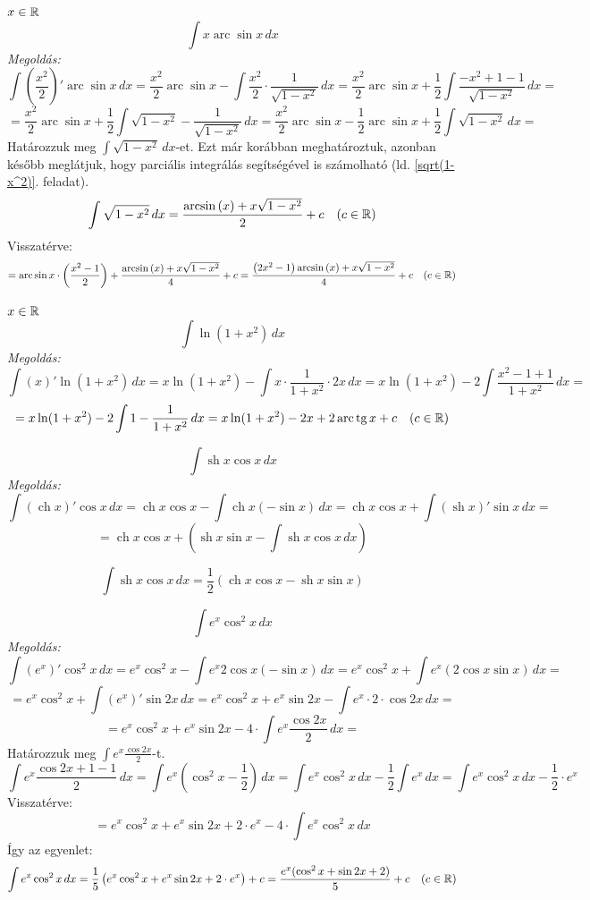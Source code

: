 \documentclass[a4paper,11.5pt]{article}
\DeclareMathOperator{\tg}{tg}
\DeclareMathOperator{\sh}{sh}
\DeclareMathOperator{\ch}{ch}
\DeclareMathOperator{\arc}{arc}
\begin{document}
	\begin{exercise}
		$x\in\mathbb{R}$
		\[ \int x\arc\sin x\,dx \]
		\textit{Megoldás:}
		\[ \int\left(\frac{x^2}{2}\right)'\arc\sin x\,dx=\frac{x^2}{2}\arc\sin x-\int\frac{x^2}{2}\cdot\frac{1}{\sqrt{1-x^2}}\,dx=\frac{x^2}{2}\arc\sin x + \frac{1}{2}\int\frac{-x^2+1-1}{\sqrt{1-x^2}}\,dx= \]
		\[ =\frac{x^2}{2}\arc\sin x+ \frac{1}{2}\int\sqrt{1-x^2}-\frac{1}{\sqrt{1-x^2}}\,dx=\frac{x^2}{2}\arc\sin x-\frac{1}{2}\arc\sin x+\frac{1}{2}\int\sqrt{1-x^2}\,dx=\]
		Határozzuk meg $\int\sqrt{1-x^2}\,dx$-et. Ezt már korábban meghatároztuk, azonban később meglátjuk, hogy parciális integrálás segítségével is számolható (ld. \ref{sqrt(1-x^2)}. feladat).
		\[ \int\sqrt{1-x^2}\,dx=\frac{\arcsin\left(x\right)+x\sqrt{1-x^2}}{2}+c\quad (c\in\mathbb{R}) \]
		Visszatérve:
		\[ =\arc\sin x\cdot\left(\frac{x^2-1}{2}\right)+\frac{\arcsin\left(x\right)+x\sqrt{1-x^2}}{4}+c=\frac{\left(2x^2-1\right)\arcsin\left(x\right)+x\sqrt{1-x^2}}{4}+c\quad (c\in\R) \]
	\end{exercise}
	\begin{exercise}
		$x\in\mathbb{R}$
		\[ \int\ln(1+x^2)\,dx\]
		\textit{Megoldás:}
		\[\int(x)'\ln(1+x^2)\,dx=x\ln(1+x^2)-\int x\cdot\frac{1}{1+x^2}\cdot 2x\,dx=x\ln(1+x^2)-2\int\frac{x^2-1+1}{1+x^2}\,dx= \]
		\[ =x\ln(1+x^2)-2\int1-\frac{1}{1+x^2}\,dx=x\ln(1+x^2)-2x+2\arc\tg x + c\quad (c\in\R) \]
	\end{exercise}
	\begin{exercise}
		\[ \int \sh x\cos x\,dx \]
		\textit{Megoldás:}
		\[ \int(\ch x)'\cos x\,dx=\ch x\cos x-\int\ch x(-\sin x)\,dx=\ch x\cos x +\int(\sh x)'\sin x\,dx=\]
		\[=\ch x\cos x+\left(\sh x\sin x-\int\sh x\cos x\,dx\right)\]
		
		\[\int \sh x\cos x\,dx=\frac{1}{2}\left(\ch x\cos x-\sh x\sin x\right) \]
	\end{exercise}
	\begin{exercise}
		\[ \int e^x\cos^2x\,dx \]
		\textit{Megoldás:}
		\[ \int (e^x)'\cos^2x\,dx=e^x\cos^2x-\int e^x2\cos x(-\sin x)\,dx=e^x\cos^2x+\int e^x(2\cos x\sin x)\,dx=\]
		\[=e^x\cos^2x+\int (e^x)'\sin2x\,dx=e^x\cos^2x+e^x\sin2x-\int e^x\cdot2\cdot\cos2x\,dx=\]
		\[ =e^x\cos^2x+e^x\sin2x-4\cdot\int e^x\frac{\cos2x}{2}\,dx= \]
		Határozzuk meg $\int e^x\frac{\cos2x}{2}$-t.
		\[\int e^x\frac{\cos2x+1-1}{2}\,dx=\int e^x\left(\cos^2x-\frac{1}{2}\right)\,dx=\int e^x\cos^2x\,dx-\frac{1}{2}\int e^x\,dx=\int e^x\cos^2x\,dx-\frac{1}{2}\cdot e^x  \]
		Visszatérve:
		\[ =e^x\cos^2x+e^x\sin2x+2\cdot e^x-4\cdot\int e^x\cos^2x\,dx \]
		Így az egyenlet:
		\[ \int e^x\cos^2x\,dx=\frac{1}{5}\left(e^x\cos^2x+e^x\sin2x+2\cdot e^x \right)+c=\frac{e^x(\cos^2x+\sin2x+2)}{5}+c\quad (c\in\mathbb{R}) \]
	\end{exercise}
\end{document}
